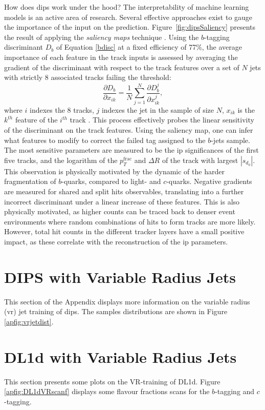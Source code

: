 How does \gls{dips} work under the hood? The interpretability of machine learning models is an active area of research. Several effective approaches exist to gauge the importance of the input on the prediction. Figure~\ref{fig:dipsSaliency} presents the result of applying the \textit{saliency maps} technique \cite{Simonyan2013DeepIC}. Using the $b$-tagging discriminant $D_b$ of Equation \ref{bdisc} at a fixed efficiency of 77\%, the average importance of each feature in the track inputs is assessed by averaging the gradient of the discriminant with respect to the track features over a set of $N$ jets with strictly 8 associated tracks failing the threshold:
\begin{equation}
  \frac{\partial D_b}{\partial x_{ik}} = \frac{1}{N} \sum_{j=1}^N \frac{\partial D_b^{j}}{\partial x_{ik}^{j}},
\end{equation} 
where $i$ indexes the 8 tracks, $j$ indexes the jet in the sample of size $N$, $x_{ik}$ is the $k^{th}$ feature of the $i^{th}$ track \cite{ATL-PHYS-PUB-2020-014}. This process effectively probes the linear sensitivity of the discriminant on the track features. Using the saliency map, one can infer what features to modify to correct the failed tag assigned to the $b$-jets sample. The most sensitive parameters are measured to be the \gls{ip} significances of the first five tracks, and the logarithm of the $p_T^{\textrm{frac}}$ and $\Delta R$ of the track with largest $|s_{d_0}|$. This observation is physically motivated by the dynamic of the harder fragmentation of $b$-quarks, compared to light- and $c$-quarks. Negative gradients are measured for shared and split hits observables, translating into a further incorrect discriminant under a linear increase of these features. This is also physically motivated, as higher counts can be traced back to denser event environments where random combinations of hits to form tracks are more likely. However, total hit counts in the different tracker layers have a small positive impact, as these correlate with the reconstruction of the \gls{ip} parameters.

\section{DIPS with Variable Radius Jets}\label{ap-DIPSVR}
This section of the Appendix displays more information on the variable radius (\gls{vr}) jet training of \gls{dips}. The samples distributions are shown in Figure \ref{apfig:vrjetdist}.

\section{DL1d with Variable Radius Jets}\label{ap-DL1dVR}
This section presents some plots on the VR-training of DL1d. Figure \ref{apfig:DL1dVRscanf} displays some flavour fractions scans for the $b$-tagging and $c$-tagging. 

